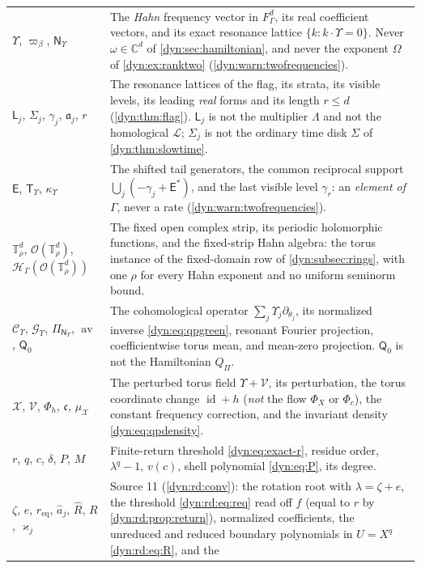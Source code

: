 \documentclass[11pt,letterpaper]{article}
\theoremstyle{definition}
\theoremstyle{remark}
\newcommand{\C}{\mathbb C}
\newcommand{\HH}{\mathscr H}
\newcommand{\OO}{\mathcal O}
\newcommand{\id}{\operatorname{id}}
\newcommand{\Li}{\mathcal L}
\newcommand{\TT}{\mathbb T}
\newcommand{\strip}{\OO(\TT^{d}_{\rho})}
\newcommand{\Cups}{\mathcal C_{\Upsilon}}
\newcommand{\Gups}{\mathcal G_{\Upsilon}}
\newcommand{\Tups}{\mathsf T_{\Upsilon}}
\newcommand{\qlat}{\mathsf N_{\Upsilon}}
\newcommand{\kups}{\kappa_{\Upsilon}}
\newcommand{\fla}{\mathfrak a}
\newcommand{\av}{\operatorname{av}}
\newcommand{\Qz}{\mathsf Q_{0}}
\numberwithin{equation}{section}
\begin{document}
\begin{longtable}{@{}P{0.22\textwidth}P{0.71\textwidth}@{}}
$\Upsilon$, $\varpi_\beta$, $\qlat$ & The \emph{Hahn} frequency vector in
$F_\Gamma^{d}$, its real coefficient vectors, and its exact resonance
lattice $\{k:k\cdot\Upsilon=0\}$. Never $\omega\in\C^{d}$ of
\cref{dyn:sec:hamiltonian}, and never the exponent $\Omega$ of
\cref{dyn:ex:ranktwo} (\cref{dyn:warn:twofrequencies}).\\[3pt]
$\mathsf L_j$, $\Sigma_j$, $\gamma_j$, $\fla_j$, $r$ & The resonance
lattices of the flag, its strata, its visible levels, its leading
\emph{real} forms and its length $r\le d$
(\cref{dyn:thm:flag}). $\mathsf L_j$ is not the multiplier $\Lambda$ and
not the homological $\Li$; $\Sigma_j$ is not the ordinary time disk
$\Sigma$ of \cref{dyn:thm:slowtime}.\\[3pt]
$\mathsf E$, $\Tups$, $\kups$ & The shifted tail generators, the common
reciprocal support $\bigcup_j(-\gamma_j+\mathsf E^{*})$, and the last
visible level $\gamma_r$: an \emph{element of $\Gamma$}, never a rate
(\cref{dyn:warn:twofrequencies}).\\[3pt]
$\TT^{d}_\rho$, $\strip$, $\HH_\Gamma(\strip)$ & The fixed open complex
strip, its periodic holomorphic functions, and the fixed-strip Hahn
algebra: the torus instance of the fixed-domain row of
\cref{dyn:subsec:rings}, with one $\rho$ for every Hahn exponent and no
uniform seminorm bound.\\[3pt]
$\Cups$, $\Gups$, $\Pi_{\qlat}$, $\av$, $\Qz$ & The cohomological operator
$\sum_j\Upsilon_j\partial_{\theta_j}$, its normalized inverse
\eqref{dyn:eq:qpgreen}, resonant Fourier projection, coefficientwise torus
mean, and mean-zero projection. $\Qz$ is not the Hamiltonian $Q_\Pi$.\\[3pt]
$\mathcal X$, $\mathcal V$, $\Phi_h$, $\mathfrak c$, $\mu_{\mathcal X}$ &
The perturbed torus field $\Upsilon+\mathcal V$, its perturbation, the
torus coordinate change $\id+h$ (\emph{not} the flow $\Phi_X$ or $\Phi_c$),
the constant frequency correction, and the invariant density
\eqref{dyn:eq:qpdensity}.\\[3pt]
$r$, $q$, $c$, $\delta$, $P$, $M$ & Finite-return threshold
\eqref{dyn:eq:exact-r}, residue order, $\lambda^{q}-1$, $v(c)$, shell
polynomial \eqref{dyn:eq:P}, its degree.\\[3pt]
$\zeta$, $e$, $r_{\mathrm{eq}}$, $\hat a_j$, $\widehat R$, $R$, $\varkappa_j$
& Source 11 (\cref{dyn:rd:conv}): the rotation root with $\lambda=\zeta+e$,
the threshold \eqref{dyn:rd:eq:req} read off $f$ (equal to $r$ by
\cref{dyn:rd:prop:return}), normalized coefficients, the unreduced and
reduced boundary polynomials in $U=X^{q}$ \eqref{dyn:rd:eq:R}, and the

\end{longtable}
\end{document}

